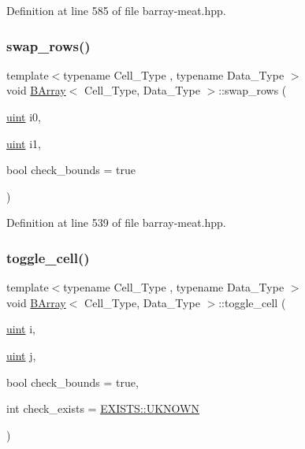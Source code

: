 Definition at line 585 of file barray-\/meat.\+hpp.

\mbox{\label{class_b_array_a742773803481c18e2865b2b2a1e68949}} 
\subsubsection{\texorpdfstring{swap\+\_\+rows()}{swap\_rows()}}
{\footnotesize\ttfamily template$<$typename Cell\+\_\+\+Type , typename Data\+\_\+\+Type $>$ \\
void \hyperlink{class_b_array}{B\+Array}$<$ Cell\+\_\+\+Type, Data\+\_\+\+Type $>$\+::swap\+\_\+rows (\begin{DoxyParamCaption}\item[{\hyperlink{typedefs_8hpp_a91ad9478d81a7aaf2593e8d9c3d06a14}{uint}}]{i0,  }\item[{\hyperlink{typedefs_8hpp_a91ad9478d81a7aaf2593e8d9c3d06a14}{uint}}]{i1,  }\item[{bool}]{check\+\_\+bounds = {\ttfamily true} }\end{DoxyParamCaption})\hspace{0.3cm}{\ttfamily [inline]}}



Definition at line 539 of file barray-\/meat.\+hpp.

\mbox{\label{class_b_array_a2ab2b200b329abc718cfb3574f566cf6}} 
\subsubsection{\texorpdfstring{toggle\+\_\+cell()}{toggle\_cell()}}
{\footnotesize\ttfamily template$<$typename Cell\+\_\+\+Type , typename Data\+\_\+\+Type $>$ \\
void \hyperlink{class_b_array}{B\+Array}$<$ Cell\+\_\+\+Type, Data\+\_\+\+Type $>$\+::toggle\+\_\+cell (\begin{DoxyParamCaption}\item[{\hyperlink{typedefs_8hpp_a91ad9478d81a7aaf2593e8d9c3d06a14}{uint}}]{i,  }\item[{\hyperlink{typedefs_8hpp_a91ad9478d81a7aaf2593e8d9c3d06a14}{uint}}]{j,  }\item[{bool}]{check\+\_\+bounds = {\ttfamily true},  }\item[{int}]{check\+\_\+exists = {\ttfamily \hyperlink{namespace_e_x_i_s_t_s_a81eb362d951445c658942a433afddb97}{E\+X\+I\+S\+T\+S\+::\+U\+K\+N\+O\+WN}} }\end{DoxyParamCaption})\hspace{0.3cm}{\ttfamily [inline]}}



